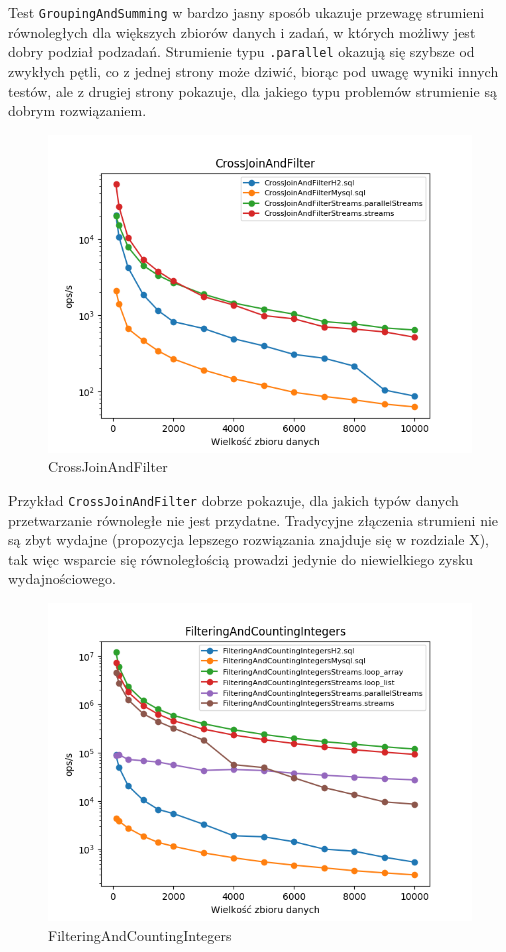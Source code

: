 \documentclass[12pt,twoside,openright]{extarticle}
\begin{document}
    Test \texttt{GroupingAndSumming} w bardzo jasny sposób ukazuje przewagę strumieni równoległych dla większych zbiorów danych i zadań, w których możliwy jest dobry podział podzadań. Strumienie typu \texttt{.parallel} okazują się szybsze od zwykłych pętli, co z jednej strony może dziwić, biorąc pod uwagę wyniki innych testów, ale z drugiej strony pokazuje, dla jakiego typu problemów strumienie są dobrym rozwiązaniem.

\newpage
\begin{figure}[H]
\centering
\includegraphics[width=15cm]{plots/CrossJoinAndFilter}
\caption{CrossJoinAndFilter}
\end{figure}

    Przykład \texttt{CrossJoinAndFilter} dobrze pokazuje, dla jakich typów danych przetwarzanie równoległe nie jest przydatne. Tradycyjne złączenia strumieni nie są zbyt wydajne (propozycja lepszego rozwiązania znajduje się w rozdziale X), tak więc wsparcie się równoległością prowadzi jedynie do niewielkiego zysku wydajnościowego.


\newpage
\begin{figure}[H]
\centering
\includegraphics[width=15cm]{plots/FilteringAndCountingIntegers}
\caption{FilteringAndCountingIntegers}
\end{figure}
\end{document}
